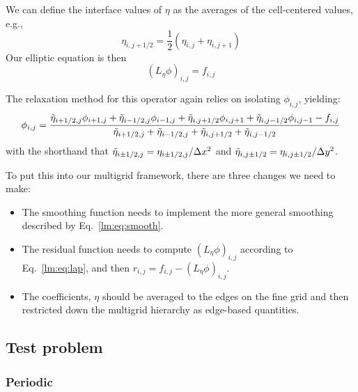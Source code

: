 We can define the interface values of $\eta$ as the averages of the
cell-centered values, e.g.,
\begin{equation}
  \eta_{i,j+1/2} = \frac{1}{2}(\eta_{i,j} + \eta_{i,j+1})
\end{equation}
Our elliptic equation is then 
\begin{equation}
(L_\eta \phi)_{i,j} = f_{i,j}
\end{equation}

The relaxation method for this operator again relies on isolating
$\phi_{i,j}$, yielding:
\begin{equation}
\phi_{i,j} = \frac{\tilde{\eta}_{i+1/2,j}\phi_{i+1,j} + \tilde{\eta}_{i-1/2,j}\phi_{i-1,j} +
                   \tilde{\eta}_{i,j+1/2}\phi_{i,j+1} + \tilde{\eta}_{i,j-1/2}\phi_{i,j-1} -
                   f_{i,j} } 
                  {\tilde{\eta}_{i+1/2,j} + \tilde{\eta}_{i-1/2,j} + 
                   \tilde{\eta}_{i,j+1/2} + \tilde{\eta}_{i,j-1/2}}
\label{lm:eq:smooth}
\end{equation}
with the shorthand that $\tilde{\eta}_{i\pm1/2,j} = \eta_{i\pm1/2,j}/\Delta x^2$
and $\tilde{\eta}_{i,j\pm1/2} = \eta_{i,j\pm1/2}/\Delta y^2$.

To put this into our multigrid framework, there are three changes we
need to make:
\begin{itemize}
\item The smoothing function needs to implement the more general smoothing
described by Eq.~\ref{lm:eq:smooth}.

\item The residual function needs to compute $(L_\eta \phi)_{i,j}$ according
to Eq.~\ref{lm:eq:lap}, and then $r_{i,j} = f_{i,j} - (L_\eta \phi)_{i,j}$.

\item The coefficients, $\eta$ should be averaged to the edges on the fine
grid and then restricted down the multigrid hierarchy as edge-based 
quantities.
\end{itemize}

\subsection{Test problem}

\subsubsection{Periodic}

\label{sec:lm:periodicbcs}

